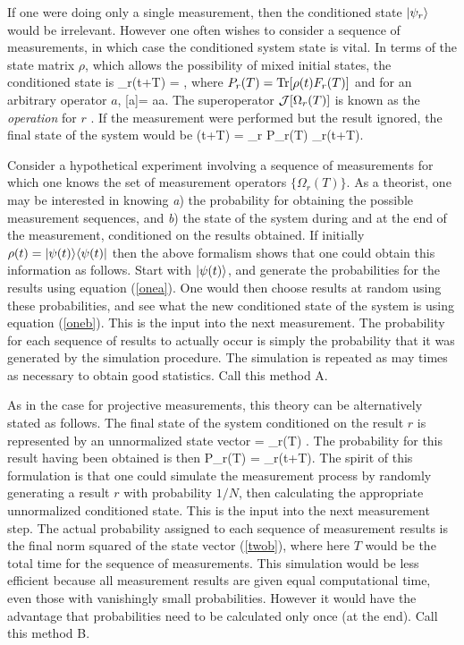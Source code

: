 \documentclass[12pt]{article}
\begin{document}
If one were doing only a single measurement, then the conditioned state
$| {\psi_r} \rangle$ would be irrelevant. However one often wishes to consider
a sequence of measurements, in which case the conditioned system state is vital. In
terms of the state matrix $\rho$, which allows the possibility of mixed initial
states, the conditioned state is 
\beq \rho_r(t+T) = , \eeq 
where $P_r(T)={\rm Tr}[\rho(t)F_r(T)]$ and for an arbitrary operator $a$, 
[a]\rho = a\rho a\dg. \label{defcalJ}
\eeq
The superoperator ${\cal J}[\Omega_r(T)]$ is known as the {\em operation} for $r$
\cite{Dav76}. If the measurement were performed but the result ignored, the final
state of the system would be
\beq \label{rop}
\rho(t+T) = \sum_r P_r(T) \rho_r(t+T).
\eeq

Consider a hypothetical experiment involving a sequence of
measurements for which one knows the set of measurement operators $\{\Omega_r(T)\}$.
As a theorist, one may be interested in knowing {\em a}) the probability for
obtaining the possible measurement sequences, and {\em b}) the state of the system
during and at the end of the measurement, conditioned on the results obtained. If
initially $\rho(t)=| {\psi(t)} \rangle\langle {\psi(t)} |$ then the above formalism shows that
one could obtain this information as follows. Start with $| {\psi(t)} \rangle$, and generate
the probabilities for the results using equation (\ref{onea}). One would then choose
results at random using these probabilities, and see what the new conditioned state
of the system is using equation (\ref{oneb}). This is the input into the next
measurement. The probability for each sequence of results to actually occur is
simply the probability that it was generated by the simulation procedure. The
simulation is repeated as may times as necessary to obtain good statistics. Call
this method A.

As in the case for projective measurements, this theory can be alternatively
stated as follows. The final state of the system conditioned on the result $r$ is
represented by an unnormalized state vector
 \beq \label{twoa}
 = \Omega_r(T) .
\eeq
The probability for this result having been obtained is  then
\beq \label{twob}
P_r(T) = \tilde{\psi}_r(t+T)\rangle.
\eeq
The spirit of this formulation is that one could simulate the measurement process
by randomly generating a result $r$ with probability $1/N$, then calculating
the appropriate unnormalized conditioned state. This is the input into the next
measurement step. The actual probability assigned to each sequence of measurement
results is the final norm squared of the state vector (\ref{twob}), where here
 $T$ would be the total time for the sequence of measurements.
This simulation would be less efficient because all measurement results are given
equal computational time, even those with vanishingly small probabilities. However
it would have the advantage that probabilities need to be calculated only once (at
the end). Call this method B.
\end{document}
